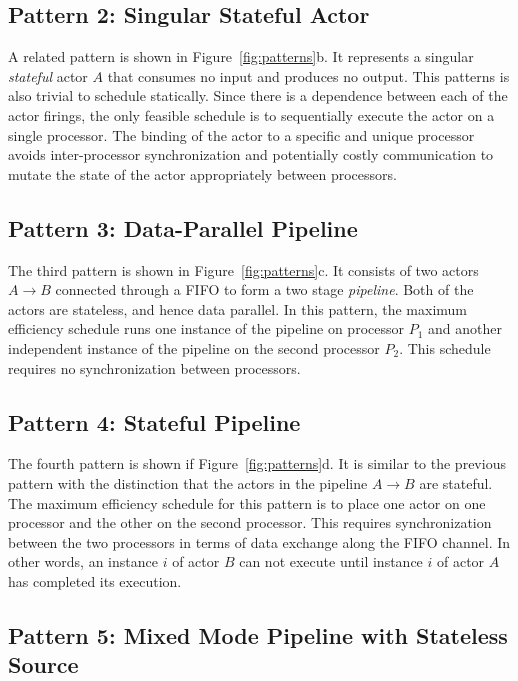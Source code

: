 \subsection{Pattern 2: Singular Stateful Actor}

A related pattern is shown in Figure~\ref{fig:patterns}b. It
represents a singular {\it stateful} actor $A$ that consumes no input
and produces no output.
This patterns is also trivial to schedule statically. Since there is a
dependence between each of the actor firings, the only feasible
schedule is to sequentially execute the actor on a single
processor. The binding of the actor to a specific and unique
processor avoids inter-processor synchronization and
potentially costly communication to mutate the state of the actor
appropriately between processors.

\subsection{Pattern 3: Data-Parallel Pipeline}

The third pattern is shown in Figure~\ref{fig:patterns}c. It consists
of two actors $A\rightarrow B$ connected through a FIFO to form a two
stage {\it pipeline}. Both of the actors are stateless, and hence data
parallel. In this pattern, the maximum efficiency schedule runs one
instance of the pipeline on processor $P_1$ and another independent
instance of the pipeline on the second processor $P_2$.  This schedule
requires no synchronization between processors.

\subsection{Pattern 4: Stateful Pipeline}

The fourth pattern is shown if Figure~\ref{fig:patterns}d. It is
similar to the previous pattern with the distinction that the actors
in the pipeline $A\rightarrow B$ are stateful. The maximum efficiency
schedule for this pattern is to place one actor on one processor and
the other on the second processor. This requires synchronization
between the two processors in terms of data exchange along the FIFO
channel. In other words, an instance $i$ of actor $B$ can not execute
until instance $i$ of actor $A$ has completed its execution.  

\subsection{Pattern 5: Mixed Mode Pipeline with Stateless Source}

